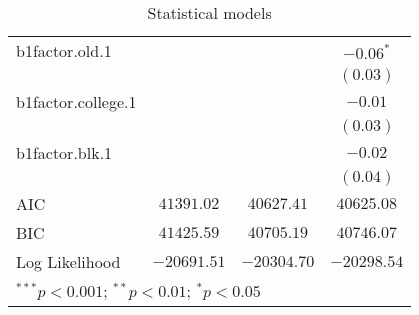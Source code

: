 \begin{table}
\begin{center}
\begin{tabular}{l c c c}
b1factor.old.1     &               &               & $-0.06^{*}$   \\
                   &               &               & $(0.03)$      \\
b1factor.college.1 &               &               & $-0.01$       \\
                   &               &               & $(0.03)$      \\
b1factor.blk.1     &               &               & $-0.02$       \\
                   &               &               & $(0.04)$      \\
\hline
AIC                & $41391.02$    & $40627.41$    & $40625.08$    \\
BIC                & $41425.59$    & $40705.19$    & $40746.07$    \\
Log Likelihood     & $-20691.51$   & $-20304.70$   & $-20298.54$   \\
\hline
\multicolumn{4}{l}{\scriptsize{$^{***}p<0.001$; $^{**}p<0.01$; $^{*}p<0.05$}}
\end{tabular}
\caption{Statistical models}
\label{table:coefficients}
\end{center}
\end{table}
